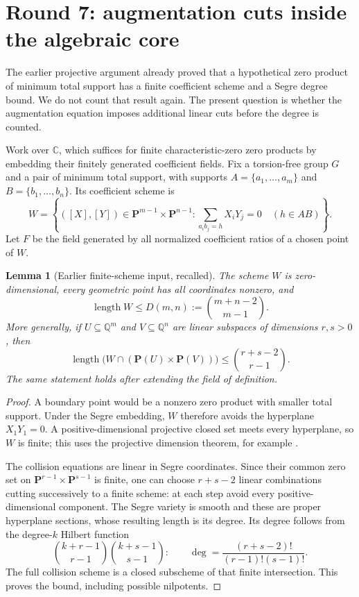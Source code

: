 \documentclass[11pt,a4paper,oneside]{report}
\newtheorem{lemma}[theorem]{Lemma}
\theoremstyle{definition}
\theoremstyle{remark}
\newcommand{\C}{\mathbb C}
\newcommand{\Q}{\mathbb Q}
\begin{document}
\section{Round 7: augmentation cuts inside the algebraic core}
\label{M13:next:alg-seven}

The earlier projective argument already proved that a hypothetical
zero product of minimum total support has a finite coefficient
scheme and a Segre degree bound. We do not count that result again.
The present question is whether the augmentation equation imposes
additional linear cuts before the degree is counted.

Work over $\C$, which suffices for finite characteristic-zero zero
products by embedding their finitely generated coefficient fields.
Fix a torsion-free group $G$ and a pair of minimum total support,
with supports $A=\{a_1,\ldots,a_m\}$ and
$B=\{b_1,\ldots,b_n\}$. Its coefficient scheme is
\[
 W=\left\{([X],[Y])\in\mathbf P^{m-1}\times\mathbf P^{n-1}:
 \sum_{a_i b_j=h}X_iY_j=0\quad(h\in AB)\right\}.
\]
Let $F$ be the field generated by all normalized coefficient ratios
of a chosen point of $W$.

\begin{lemma}[Earlier finite-scheme input, recalled]
\label{M13:next:segre-input}
The scheme $W$ is zero-dimensional, every geometric point has all
coordinates nonzero, and
\[
 \operatorname{length}W\le D(m,n):=\binom{m+n-2}{m-1}.
\]
More generally, if $U\subseteq\Q^m$ and $V\subseteq\Q^n$ are
linear subspaces of dimensions $r,s>0$, then
\[
 \operatorname{length}\bigl(W\cap(\mathbf P(U)\times\mathbf P(V))\bigr)
 \le\binom{r+s-2}{r-1}.
\]
The same statement holds after extending the field of definition.
\end{lemma}
\begin{proof}
A boundary point would be a nonzero zero product with smaller
total support. Under the Segre embedding, $W$ therefore avoids the
hyperplane $X_1Y_1=0$. A positive-dimensional projective closed set
meets every hyperplane, so $W$ is finite; this uses the projective
dimension theorem, for example \cite[Lemma 33.34.3]{B:StacksProjective}.

The collision equations are linear in Segre coordinates. Since their
common zero set on $\mathbf P^{r-1}\times\mathbf P^{s-1}$ is finite,
one can choose $r+s-2$ linear combinations cutting successively to
a finite scheme: at each step avoid every positive-dimensional
component. The Segre variety is smooth and these are proper
hyperplane sections, whose resulting length is its degree. Its
degree follows from the degree-$k$ Hilbert function
\[
 \binom{k+r-1}{r-1}\binom{k+s-1}{s-1}:
 \qquad \deg=\frac{(r+s-2)!}{(r-1)!(s-1)!}.
\]
The full collision scheme is a closed subscheme of that finite
intersection. This proves the bound, including possible nilpotents.
\end{proof}
\end{document}
